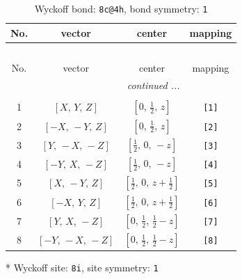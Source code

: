 \documentclass[fleqn,8pt]{jsarticle}
\begin{document}
\renewcommand{\arraystretch}{1.2}
\begin{longtable}{cccc}
\caption{Wyckoff bond: {\tt 8c@4h}, bond symmetry: {\tt 1}}
 \\
 \hline \hline
No. & vector & center & mapping \\ \hline \endfirsthead

\multicolumn{3}{l}{\tablename\ \thetable{}} \\
 \hline \hline
No. & vector & center & mapping \\ \hline \endhead

 \hline \hline
\multicolumn{3}{r}{\footnotesize\it continued ...} \\ \endfoot

 \hline \hline
\multicolumn{3}{r}{} \\ \endlastfoot

1 & $\left[ X,\, Y,\, Z \right]$ & $\left[ 0,\, \frac{1}{2},\, z \right]$ & {\tt [1]} \\ \hline
2 & $\left[ - X,\, - Y,\, Z \right]$ & $\left[ 0,\, \frac{1}{2},\, z \right]$ & {\tt [2]} \\ \hline
3 & $\left[ Y,\, - X,\, - Z \right]$ & $\left[ \frac{1}{2},\, 0,\, - z \right]$ & {\tt [3]} \\ \hline
4 & $\left[ - Y,\, X,\, - Z \right]$ & $\left[ \frac{1}{2},\, 0,\, - z \right]$ & {\tt [4]} \\ \hline
5 & $\left[ X,\, - Y,\, Z \right]$ & $\left[ \frac{1}{2},\, 0,\, z + \frac{1}{2} \right]$ & {\tt [5]} \\ \hline
6 & $\left[ - X,\, Y,\, Z \right]$ & $\left[ \frac{1}{2},\, 0,\, z + \frac{1}{2} \right]$ & {\tt [6]} \\ \hline
7 & $\left[ Y,\, X,\, - Z \right]$ & $\left[ 0,\, \frac{1}{2},\, \frac{1}{2} - z \right]$ & {\tt [7]} \\ \hline
8 & $\left[ - Y,\, - X,\, - Z \right]$ & $\left[ 0,\, \frac{1}{2},\, \frac{1}{2} - z \right]$ & {\tt [8]} \\
\end{longtable}
* Wyckoff site: {\tt 8i}, site symmetry: {\tt 1}
\renewcommand{\arraystretch}{1.2}
\end{document}

